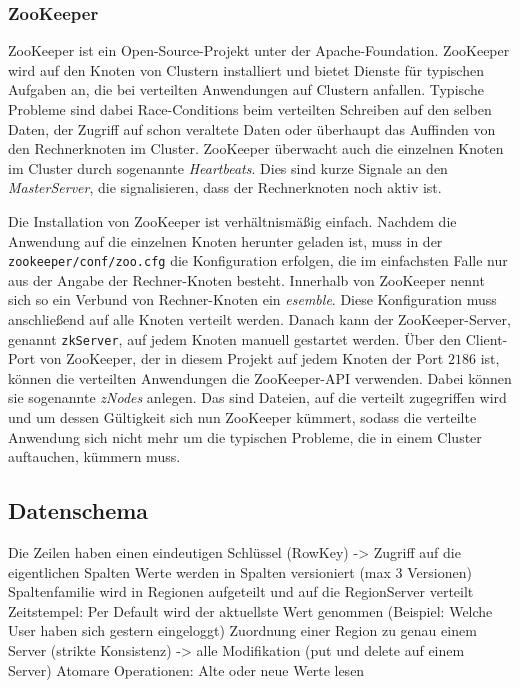 \subsubsection{ZooKeeper}\label{zook}
ZooKeeper ist ein Open-Source-Projekt unter der Apache-Foundation. ZooKeeper wird auf den Knoten von Clustern installiert und bietet 
Dienste für typischen Aufgaben an, die bei verteilten Anwendungen auf Clustern anfallen. Typische Probleme sind dabei Race-Conditions 
beim verteilten Schreiben auf den selben Daten, der Zugriff auf schon veraltete Daten oder überhaupt das Auffinden von den Rechnerknoten im
Cluster. ZooKeeper überwacht auch die einzelnen Knoten im Cluster durch sogenannte \textit{Heartbeats}. Dies sind kurze Signale an den  \textit{MasterServer},
die signalisieren, dass der Rechnerknoten noch aktiv ist. 

Die Installation von ZooKeeper ist verhältnismäßig einfach. Nachdem die Anwendung auf die einzelnen Knoten herunter geladen ist, muss in der 
\newline \texttt{zookeeper/conf/zoo.cfg}
die Konfiguration erfolgen, die im einfachsten Falle nur aus der Angabe der Rechner-Knoten besteht. Innerhalb von ZooKeeper nennt sich so ein Verbund
von Rechner-Knoten ein \textit{esemble}. Diese Konfiguration muss anschließend auf alle Knoten verteilt werden. Danach kann der ZooKeeper-Server, genannt \texttt{zkServer},
auf jedem Knoten manuell gestartet werden. Über den Client-Port von ZooKeeper, der in diesem Projekt auf jedem Knoten der Port $2186$ ist, können die verteilten
Anwendungen die ZooKeeper-API verwenden. Dabei können sie sogenannte \textit{zNodes} anlegen. Das sind Dateien, auf die verteilt zugegriffen wird und um dessen
Gültigkeit sich nun ZooKeeper kümmert, sodass die verteilte Anwendung sich nicht mehr um die typischen Probleme, die in einem Cluster auftauchen, kümmern muss.

\subsection{Datenschema}\label{hbase_datenschema}
Die Zeilen haben einen eindeutigen Schlüssel (RowKey) -> Zugriff auf die eigentlichen Spalten
Werte werden in Spalten versioniert (max 3 Versionen)
Spaltenfamilie wird in Regionen aufgeteilt und auf die RegionServer verteilt
Zeitstempel: Per Default wird der aktuellste Wert genommen (Beispiel: Welche User haben sich gestern eingeloggt)
Zuordnung einer Region zu genau einem Server (strikte Konsistenz) -> alle Modifikation (put und delete auf einem Server)
Atomare Operationen: Alte oder neue Werte lesen


